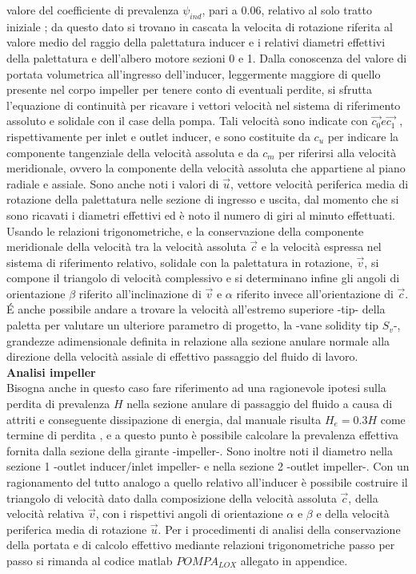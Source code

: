 valore del coefficiente di prevalenza $\psi_{ind}$, pari a $0.06$, relativo al solo tratto iniziale \cite{AIAA_book_1}; da questo dato si trovano in cascata la velocita di rotazione riferita al valore medio del raggio della palettatura inducer e i relativi diametri effettivi della palettatura e dell'albero motore sezioni 0 e 1. Dalla conoscenza del valore di portata volumetrica all'ingresso dell'inducer, leggermente maggiore di quello presente nel corpo impeller per tenere conto di eventuali perdite, si sfrutta l'equazione di continuità per ricavare i vettori velocità nel sistema di riferimento assoluto e solidale con il case della pompa. Tali velocità sono indicate con $\overrightarrow{c_0} e \overrightarrow{c_1}$ , rispettivamente per inlet e outlet inducer, e sono costituite da $c_u$ per indicare la componente tangenziale della velocità assoluta e da $c_m$ per riferirsi alla velocità meridionale, ovvero la componente della velocità assoluta che appartiene al piano radiale e assiale. Sono anche noti i valori di $\overrightarrow{u}$, vettore velocità periferica media di rotazione della palettatura nelle sezione di ingresso e uscita, dal momento che si sono ricavati i diametri effettivi ed è noto il numero di giri al minuto effettuati. Usando le relazioni trigonometriche, e la conservazione della componente meridionale della velocità tra la velocità assoluta $\overrightarrow{c}$ e la velocità espressa nel sistema di riferimento relativo, solidale con la palettatura in rotazione, $\overrightarrow{v}$, si compone il triangolo di velocità complessivo e si determinano infine gli angoli di orientazione $\beta$ riferito all'inclinazione di  $\overrightarrow{v}$ e $\alpha$ riferito invece all'orientazione di $\overrightarrow{c}$.
\'E anche possibile andare a trovare la velocità all'estremo superiore -tip- della paletta per valutare un ulteriore parametro di progetto, la -vane solidity tip $S_v$-, grandezze adimensionale definita in relazione alla sezione anulare normale alla direzione della velocità assiale di effettivo passaggio del fluido di lavoro.\\

\textbf{Analisi impeller}\\
Bisogna anche in questo caso fare riferimento ad una ragionevole ipotesi sulla perdita di prevalenza $H$ nella sezione anulare di passaggio del fluido a causa di attriti e conseguente dissipazione di energia, dal manuale risulta $H_e = 0.3H$ come termine di perdita \cite{AIAA_book_1}, e a questo punto è possibile calcolare la prevalenza effettiva fornita dalla sezione della girante -impeller-. Sono inoltre noti il diametro nella sezione 1 -outlet inducer/inlet impeller- e nella sezione 2 -outlet impeller-. Con un ragionamento del tutto analogo a quello relativo all'inducer è possibile costruire il triangolo di velocità dato dalla composizione della velocità assoluta  $\overrightarrow{c}$, della velocità relativa $\overrightarrow{v}$, con i rispettivi angoli di orientazione $\alpha$ e $\beta$ e della velocità periferica media di rotazione $\overrightarrow{u}$. Per i procedimenti di analisi della conservazione della portata e di calcolo effettivo mediante relazioni trigonometriche passo per passo si rimanda al codice matlab $POMPA_{LOX}$ allegato in appendice.
\\

